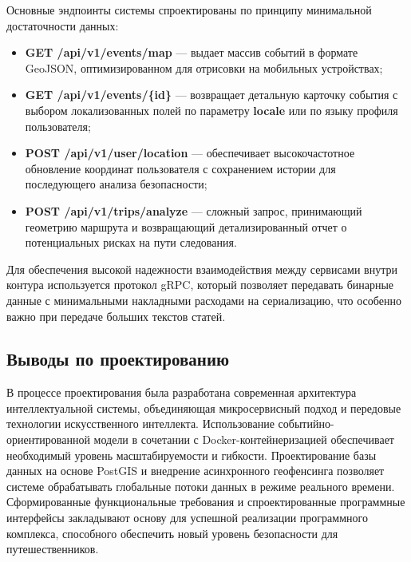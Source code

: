 Основные эндпоинты системы спроектированы по принципу минимальной достаточности данных:
\begin{itemize}
    \item \textbf{GET /api/v1/events/map} --- выдает массив событий в формате GeoJSON, оптимизированном для отрисовки на мобильных устройствах;
    \item \textbf{GET /api/v1/events/\{id\}} --- возвращает детальную карточку события с выбором локализованных полей по параметру \textbf{locale} или по языку профиля пользователя;
    \item \textbf{POST /api/v1/user/location} --- обеспечивает высокочастотное обновление координат пользователя с сохранением истории для последующего анализа безопасности;
    \item \textbf{POST /api/v1/trips/analyze} --- сложный запрос, принимающий геометрию маршрута и возвращающий детализированный отчет о потенциальных рисках на пути следования.
\end{itemize}

Для обеспечения высокой надежности взаимодействия между сервисами внутри контура используется протокол gRPC, который позволяет передавать бинарные данные с минимальными накладными расходами на сериализацию, что особенно важно при передаче больших текстов статей.

\subsection{Выводы по проектированию}

В процессе проектирования была разработана современная архитектура интеллектуальной системы, объединяющая микросервисный подход и передовые технологии искусственного интеллекта. Использование событийно-ориентированной модели в сочетании с Docker-контейнеризацией обеспечивает необходимый уровень масштабируемости и гибкости. Проектирование базы данных на основе PostGIS и внедрение асинхронного геофенсинга позволяет системе обрабатывать глобальные потоки данных в режиме реального времени. Сформированные функциональные требования и спроектированные программные интерфейсы закладывают основу для успешной реализации программного комплекса, способного обеспечить новый уровень безопасности для путешественников.

